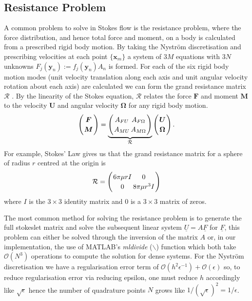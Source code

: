 \subsection{Resistance Problem} \label{sec:resistance}
A common problem to solve in Stokes flow is the resistance problem, where the force distribution, and hence total force and moment, on a body is calculated from a prescribed rigid body motion. By taking the Nyström discretisation
and prescribing velocities at each point $\{\bm{x}_m\}$ a system of $3M$ equations with $3N$ unknowns $F_j(\bm{y}_n) := f_j(\bm{y}_n)A_n$ is formed. For each of the six rigid body motion modes (unit velocity translation along each axis and unit angular velocity rotation about each axis) are calculated we can form the grand resistance matrix $\mathcal{R}$ \cite{Pozrikidis1992BoundaryFlow}. By the linearity of the Stokes equation, $\mathcal{R}$ relates the force $\mathbf{F}$ and moment $\mathbf{M}$ to the velocity $\mathbf{U}$ and angular velocity $\mathbf{\Omega}$ for any rigid body motion. 
\begin{equation}
\arraycolsep=1pt\def\arraystretch{1.2}
\left(
\begin{array}{c}
\boldsymbol{F} \\
\boldsymbol{M}
\end{array}\right)=\underbrace{\left(\begin{array}{cc}
A_{F U} & A_{F \Omega} \\
A_{M U} & A_{M \Omega}
\end{array}\right)}_{\mathcal{R}}\left(\begin{array}{c}
\boldsymbol{U} \\
\boldsymbol{\Omega}
\end{array}\right) .
\label{eq:GrandResistance}
\end{equation}
 For example, Stokes' Law gives us that the grand resistance matrix for a sphere of radius $r$ centred at the origin is
 \begin{equation}
\arraycolsep=1pt\def\arraystretch{1.2}
\mathcal{R}=\left(\begin{array}{cc}
6\pi\mu r I & 0 \\
0 & 8\pi\mu r^3 I
\end{array}\right)
\label{eq:sphereres}
\end{equation}
where $I$ is the $3\times 3$ identity matrix and $0$ is a $3\times 3$ matrix of zeros.

The most common method for solving the resistance problem is to generate the full stokeslet matrix and solve the subsequent linear system $\underline{U} = A\underline{F}$ for $\underline{F}$, this problem can either be solved through the inversion of the matrix $A$ or, in our implementation, the use of MATLAB's \textit{mldivide} ($\backslash$) function which both take $\mathcal{O}(N^3)$ operations to compute the solution for dense systems. For the Nyström discretisation we have a regularisation error term of $\mathcal{O}(h^2\epsilon^{-1})+\mathcal{O}(\epsilon)$ so, to reduce regularisation error via reducing epsilon, one must reduce $h$ accordingly like $\sqrt{\epsilon}$ hence the number of quadrature points $N$ grows like $1/(\sqrt{\epsilon})^2=1/\epsilon$.


